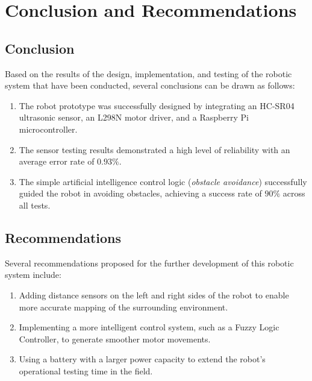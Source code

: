 \section{Conclusion and Recommendations}
\label{sec:kesimpulan_saran}

\subsection{Conclusion}
Based on the results of the design, implementation, and testing of the robotic system that have been conducted, several conclusions can be drawn as follows:
\begin{enumerate}
    \item The robot prototype was successfully designed by integrating an HC-SR04 ultrasonic sensor, an L298N motor driver, and a Raspberry Pi microcontroller.
    \item The sensor testing results demonstrated a high level of reliability with an average error rate of $0.93\%$.
    \item The simple artificial intelligence control logic (\textit{obstacle avoidance}) successfully guided the robot in avoiding obstacles, achieving a success rate of $90\%$ across all tests.
\end{enumerate}

\subsection{Recommendations}
Several recommendations proposed for the further development of this robotic system include:
\begin{enumerate}
    \item Adding distance sensors on the left and right sides of the robot to enable more accurate mapping of the surrounding environment.
    \item Implementing a more intelligent control system, such as a Fuzzy Logic Controller, to generate smoother motor movements.
    \item Using a battery with a larger power capacity to extend the robot's operational testing time in the field.
\end{enumerate}